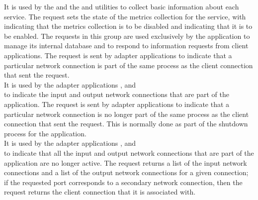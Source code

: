 It is used by the  and the
 and 
utilities to collect basic information about each service.
The  request sets the state of the metrics
collection for the service, with  indicating that the metrics collection is
to be disabled and  indicating that it is to be enabled.
\secondaryEnd{}
The requests in this group are used exclusively by the
 application to manage its internal
database and to respond to information requests from client applications.
The  request is sent by
adapter applications to indicate that a particular \yarp{} network connection is part of
the same process as the client connection that sent the request.\\

It is used by the adapter applications ,
 and\\
 to indicate the input and output
\yarp{} network connections that are part of the application.
The  request is sent by
adapter applications to indicate that a particular \yarp{} network connection is no
longer part of the same process as the client connection that sent the request.
This is normally done as part of the shutdown process for the application.\\

It is used by the adapter applications ,
 and\\
 to indicate that all the input and
output \yarp{} network connections that are part of the application are no longer active.
The  request returns
a list of the input \yarp{} network connections and a list of the output \yarp{} network
connections for a given connection; if the requested port corresponds to a secondary
\yarp{} network connection, then the request returns the client connection that it is
associated with.\\

